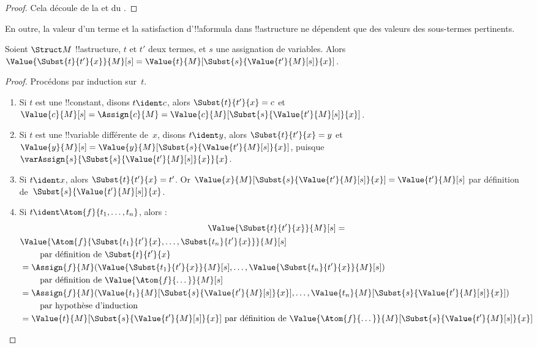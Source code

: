 \documentclass[../../../include/open-logic-section]{subfiles}
\begin{document}
\begin{proof}
Cela découle de la  et du
.
\end{proof}

En outre, la valeur d'un terme et la satisfaction d'!!a{formula}
dans !!a{structure} ne dépendent que des valeurs des sous-termes
pertinents.

\begin{prop}
Soient $\Struct M$ !!a{structure}, $t$ et $t'$ deux termes, et $s$
une assignation de variables. Alors
$\Value{\Subst{t}{t'}{x}}{M}[s] =
\Value{t}{M}[\Subst{s}{\Value{t'}{M}[s]}{x}]$.
\end{prop}

\begin{proof}
Procédons par induction sur~$t$.
\begin{enumerate}
\item Si $t$ est une !!{constant}, disons $t\ident c$, alors
  $\Subst{t}{t'}{x} = c$ et
  $\Value{c}{M}[s] = \Assign{c}{M} =
  \Value{c}{M}[\Subst{s}{\Value{t'}{M}[s]}{x}]$.

\item Si $t$ est une !!{variable} différente de~$x$, disons
  $t \ident y$, alors $\Subst{t}{t'}{x} = y$ et
  $\Value{y}{M}[s] =
  \Value{y}{M}[\Subst{s}{\Value{t'}{M}[s]}{x}]$, puisque
  $\varAssign{s}{\Subst{s}{\Value{t'}{M}[s]}{x}}{x}$.

\item Si $t \ident x$, alors $\Subst{t}{t'}{x} = t'$. Or
  $\Value{x}{M}[\Subst{s}{\Value{t'}{M}[s]}{x}] = \Value{t'}{M}[s]$ par
  définition de~$\Subst{s}{\Value{t'}{M}[s]}{x}$.

\item Si $t \ident \Atom{f}{t_1,\dots,t_n}$, alors :
\begin{multline*}
  \Value{\Subst{t}{t'}{x}}{M}[s]  = \\
  \begin{aligned}[b]
& \Value{\Atom{f}{\Subst{t_1}{t'}{x}, \dots, \Subst{t_n}{t'}{x}}}{M}[s]\\
& \qquad    \text{ par définition de $\Subst{t}{t'}{x}$}\\
& = \Assign{f}{M}(\Value{\Subst{t_1}{t'}{x}}{M}[s], \dots,
    \Value{\Subst{t_n}{t'}{x}}{M}[s])\\
    & \qquad  \text{ par définition de $\Value{\Atom{f}{\dots}}{M}[s]$}\\
& = \Assign{f}{M}(\Value{t_1}{M}[\Subst{s}{\Value{t'}{M}[s]}{x}], \dots,
   \Value{t_n}{M}[\Subst{s}{\Value{t'}{M}[s]}{x}])\\
& \qquad    \text{ par hypothèse d'induction}\\
& = \Value{t}{M}[\Subst{s}{\Value{t'}{M}[s]}{x}]
    \text{ par définition de $\Value{\Atom{f}{\dots}}{M}[\Subst{s}{\Value{t'}{M}[s]}{x}]$}
  \end{aligned}
\end{multline*}
\end{enumerate}
\end{proof}
\end{document}
